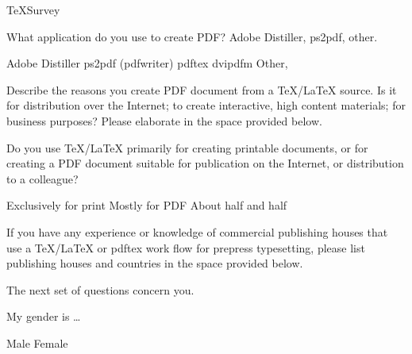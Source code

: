 \documentclass{article}
\begin{document}
\begin{exam}{TeXSurvey}
\goodbreak
\begin{eqComments}\end{eqComments}

\begin{problem}
What application do you use to create PDF? Adobe Distiller, ps2pdf, other.
\begin{answers}{3}
\rowsep{1bp}
    \bChoices
         Adobe Distiller\eAns
         \textsf{ps2pdf} (\textsf{pdfwriter})\eAns
         \textsf{pdftex}\eAns
         \textsf{dvipdfm}\eAns
         Other, \eAns
    \eChoices
\end{answers}
\end{problem}

\begin{problem}
Describe the reasons you create PDF document from a \TeX/\LaTeX{} source. Is it for
distribution over the Internet; to create interactive, high
content materials; for business purposes? Please elaborate in the
space provided below.
\begin{solution}[.75in]
\end{solution}
\end{problem}

\begin{problem}
Do you use {\TeX/\LaTeX} primarily for creating printable documents, or for creating
a PDF document suitable for publication on the Internet, or distribution to a colleague?
\begin{answers}{3}
    \bChoices
     Exclusively for print\eAns
     Mostly for PDF\eAns
     About half and half\eAns
    \eChoices
\end{answers}
\end{problem}

\begin{problem}
If you have any experience or knowledge of commercial publishing
houses that use a \TeX/\LaTeX{} or \textsf{pdftex} work flow  for
prepress typesetting,  please list publishing houses and countries
in the space provided below.
\begin{solution}[.75in]
\end{solution}
\end{problem}

\begin{eqComments}
The next set of questions concern you.
\end{eqComments}

\begin{problem}
My gender is \dots
\begin{answers}{5}
    \bChoices
         Male\eAns
         Female\eAns
         \eAns
    \eChoices
\end{answers}
\end{problem}


\end{exam}
\end{document}
